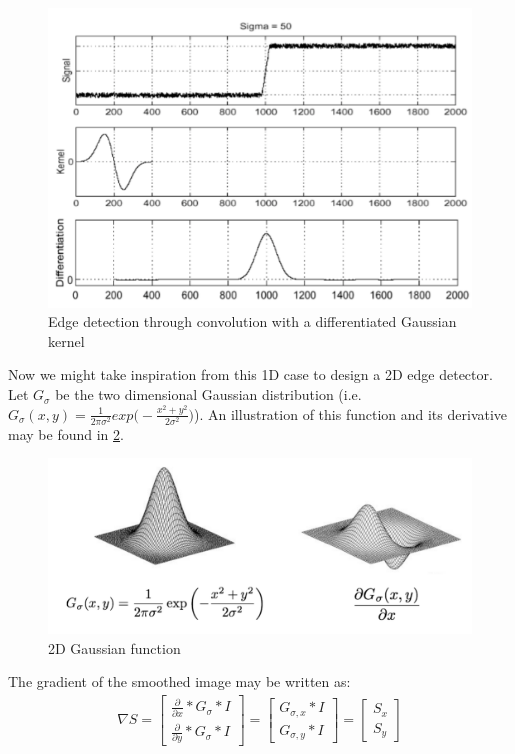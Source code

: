 \documentclass[twoside]{article}
\begin{document}
\begin{figure}[h]
	\centering
	\includegraphics[scale=.5]{better_kernel.PNG}
    \caption{Edge detection through convolution with a differentiated Gaussian kernel}
    \label{ker}
\end{figure}

Now we might take inspiration from this 1D case to design a 2D edge detector. Let $G_\sigma$ be the two dimensional Gaussian distribution (i.e. $G_\sigma(x,y)=\frac{1}{2\pi\sigma^2}exp\bigg(-\frac{x^2+y^2}{2\sigma^2}\bigg)$). An illustration of this function and its derivative may be found in \ref{2dgauss}.

\begin{figure}[h]
	\centering
	\includegraphics[scale=.3]{2d_equivalent.PNG}
    \caption{2D Gaussian function}
    \label{2dgauss}
\end{figure}

The gradient of the smoothed image may be written as:
\begin{gather*}
\nabla S= \begin{bmatrix}
\frac{\partial}{\partial x} * G_\sigma * I \\ \frac{\partial}{\partial y} * G_\sigma * I \end{bmatrix}= \begin{bmatrix}
G_{\sigma,x} * I\\G_{\sigma,y} * I
\end{bmatrix}=\begin{bmatrix}
S_x\\S_y
\end{bmatrix}
\end{gather*}
\end{document}
